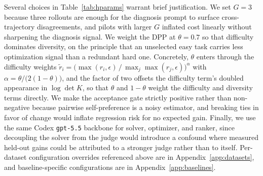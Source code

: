 Several choices in Table~\ref{tab:hparams} warrant brief justification.
We set $G=3$ because three rollouts are enough for the diagnosis prompt to surface cross-trajectory disagreements, and pilots with larger $G$ inflated cost linearly without sharpening the diagnosis signal.
We weight the DPP at $\theta=0.7$ so that difficulty dominates diversity, on the principle that an unselected easy task carries less optimization signal than a redundant hard one.
Concretely, $\theta$ enters through the difficulty weights $\widetilde{r}_i = \big(\max(r_i,\epsilon)\,/\,\max_j \max(r_j,\epsilon)\big)^{\alpha}$ with $\alpha = \theta/\big(2(1-\theta)\big)$, and the factor of two offsets the difficulty term's doubled appearance in $\log\det K$, so that $\theta$ and $1-\theta$ weight the difficulty and diversity terms directly.
We make the acceptance gate strictly positive rather than non-negative because pairwise self-preference is a noisy estimator, and breaking ties in favor of change would inflate regression risk for no expected gain.
Finally, we use the same Codex \texttt{gpt-5.5} backbone for solver, optimizer, and ranker, since decoupling the solver from the judge would introduce a confound where measured held-out gains could be attributed to a stronger judge rather than to \method{} itself.
Per-dataset configuration overrides referenced above are in Appendix~\ref{app:datasets}, and baseline-specific configurations are in Appendix~\ref{app:baselines}.
